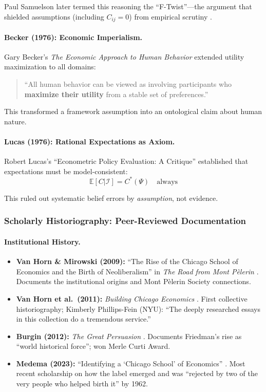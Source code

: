 Paul Samuelson later termed this reasoning the ``F-Twist''---the argument that shielded
assumptions (including $C_{ij} = 0$) from empirical scrutiny \citep{samuelson1963}.

\paragraph{Becker (1976): Economic Imperialism.}
Gary Becker's \textit{The Economic Approach to Human Behavior} \citep{becker1976}
extended utility maximization to all domains:
\begin{quote}
``All human behavior can be viewed as involving participants who \textbf{maximize their
utility} from a stable set of preferences.''
\end{quote}

This transformed a framework assumption into an ontological claim about human nature.

\paragraph{Lucas (1976): Rational Expectations as Axiom.}
Robert Lucas's ``Econometric Policy Evaluation: A Critique'' \citep{lucas1976} established
that expectations must be model-consistent:
\begin{equation}
\mathbb{E}[C | \mathcal{I}] = C^*(\Psi) \quad \text{always}
\end{equation}

This ruled out systematic belief errors by \textit{assumption}, not evidence.

\subsubsection{Scholarly Historiography: Peer-Reviewed Documentation}

\paragraph{Institutional History.}
\begin{itemize}[nosep]
    \item \textbf{Van Horn \& Mirowski (2009):} ``The Rise of the Chicago School of Economics
        and the Birth of Neoliberalism'' in \textit{The Road from Mont P\`{e}lerin}
        \citep{vanhorn2009}. Documents the institutional origins and Mont P\`{e}lerin
        Society connections.
    \item \textbf{Van Horn et al.\ (2011):} \textit{Building Chicago Economics}
        \citep{vanhorn2011}. First collective historiography; Kimberly Phillips-Fein (NYU):
        ``The deeply researched essays in this collection do a tremendous service.''
    \item \textbf{Burgin (2012):} \textit{The Great Persuasion} \citep{burgin2012}.
        Documents Friedman's rise as ``world historical force''; won Merle Curti Award.
    \item \textbf{Medema (2023):} ``Identifying a `Chicago School' of Economics''
        \citep{medema2023chicago}. Most recent scholarship on how the label emerged
        and was ``rejected by two of the very people who helped birth it'' by 1962.
\end{itemize}


